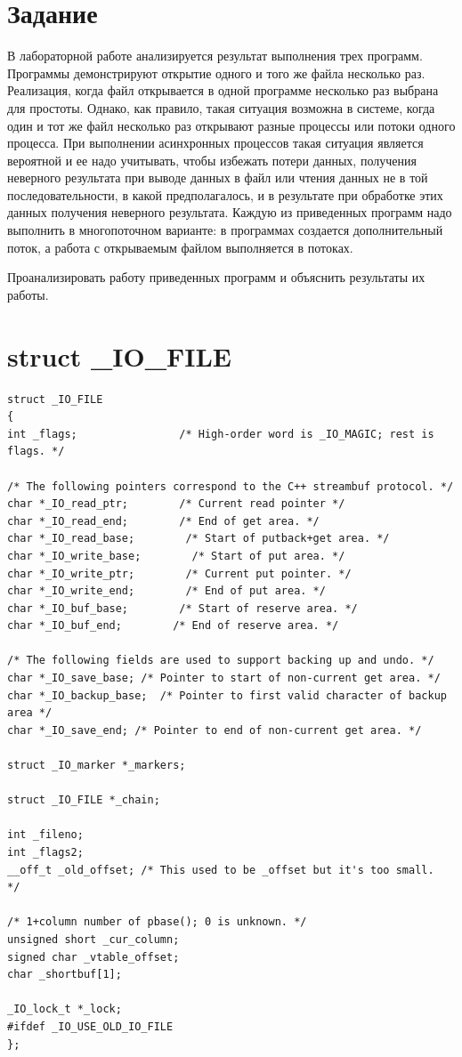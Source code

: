 \section*{Задание}
В лабораторной работе анализируется результат выполнения трех программ. Программы демонстрируют открытие одного и того же файла несколько раз. Реализация, когда файл открывается в одной программе несколько раз выбрана для простоты. Однако, как правило, такая ситуация возможна в системе, когда один и тот же файл несколько раз открывают разные процессы или потоки одного процесса. При выполнении асинхронных процессов такая ситуация является вероятной и ее надо учитывать, чтобы избежать потери данных, получения неверного результата при выводе данных в файл или чтения данных не в той последовательности, в какой предполагалось, и в результате при обработке этих данных получения неверного результата.
Каждую из приведенных программ надо выполнить в многопоточном варианте: в программах создается дополнительный поток, а работа с открываемым файлом выполняется в потоках.

Проанализировать работу приведенных программ и объяснить результаты их работы.

\section*{struct \_IO\_FILE}
\begin{lstlisting}
struct _IO_FILE
{
int _flags;                /* High-order word is _IO_MAGIC; rest is flags. */

/* The following pointers correspond to the C++ streambuf protocol. */
char *_IO_read_ptr;        /* Current read pointer */
char *_IO_read_end;        /* End of get area. */
char *_IO_read_base;        /* Start of putback+get area. */
char *_IO_write_base;        /* Start of put area. */
char *_IO_write_ptr;        /* Current put pointer. */
char *_IO_write_end;        /* End of put area. */
char *_IO_buf_base;        /* Start of reserve area. */
char *_IO_buf_end;        /* End of reserve area. */

/* The following fields are used to support backing up and undo. */
char *_IO_save_base; /* Pointer to start of non-current get area. */
char *_IO_backup_base;  /* Pointer to first valid character of backup area */
char *_IO_save_end; /* Pointer to end of non-current get area. */

struct _IO_marker *_markers;

struct _IO_FILE *_chain;

int _fileno;
int _flags2;
__off_t _old_offset; /* This used to be _offset but it's too small.  */

/* 1+column number of pbase(); 0 is unknown. */
unsigned short _cur_column;
signed char _vtable_offset;
char _shortbuf[1];

_IO_lock_t *_lock;
#ifdef _IO_USE_OLD_IO_FILE
};

\end{lstlisting}

